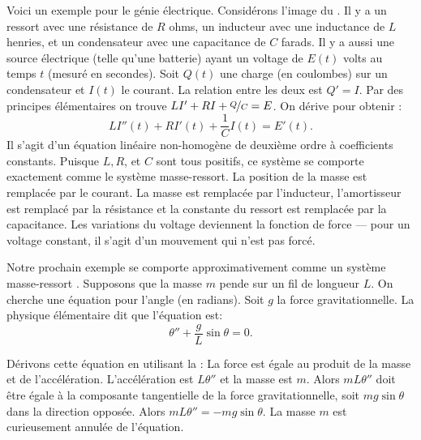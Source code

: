 \medskip

\begin{mywrapfigsimp}[5]{1.35in}{1.65in}
\noindent
{}
\end{mywrapfigsimp}
Voici un exemple pour le génie électrique. Considérons l'image du .
Il y a un ressort avec une résistance de $R$ ohms, un inducteur avec une inductance de $L$ henries,
et un condensateur avec une capacitance de $C$ farads.  Il y a aussi une source électrique (telle qu'une batterie) ayant un voltage de  $E(t)$ volts au temps $t$ (mesuré en secondes).
Soit $Q(t)$ une charge (en coulombes) sur un condensateur et $I(t)$ le courant.  La relation entre les deux est
$Q' = I$.  Par des principes élémentaires on trouve 
$L I' + RI + \nicefrac{Q}{C} = E$.  On dérive pour obtenir :   
\begin{equation*}
L I''(t) + R I'(t) + \frac{1}{C} I(t) = E'(t) .
\end{equation*}
Il s'agit d'un équation linéaire non-homogène de deuxième ordre à coefficients constants. 
Puisque $L, R$, et $C$ sont tous positifs, ce système se comporte exactement comme le système masse-ressort. La position de la masse est remplacée par le courant. La masse est remplacée par l'inducteur, l'amortisseur est remplacé par la résistance et la constante du ressort est remplacée par la capacitance. Les variations du voltage deviennent la fonction de force --- pour un voltage constant, il s'agit d'un mouvement qui n'est pas forcé. 

\medskip

\begin{mywrapfigsimp}[10]{1.8in}{2.16in}
\noindent
{}
\end{mywrapfigsimp}
Notre prochain exemple se comporte approximativement comme un système masse-ressort .  
Supposons que la masse $m$ pende sur un fil de longueur  $L$.  On cherche une équation pour l'angle (en radians). Soit $g$ la force gravitationnelle. La physique élémentaire dit que l'équation est: 
\begin{equation*}
\theta'' + \frac{g}{L} \sin \theta = 0 .
\end{equation*}

Dérivons cette équation en utilisant la :
La force est égale au produit de la masse et de l'accélération. L'accélération est
$L \theta''$ et la masse est $m$.  Alors $mL\theta''$ doit être égale à la composante tangentielle de la force gravitationnelle, soit 
$m g \sin \theta$ dans la direction opposée.
Alors $mL\theta'' = -mg \sin \theta$.
La masse $m$ est curieusement  annulée de l'équation. 

